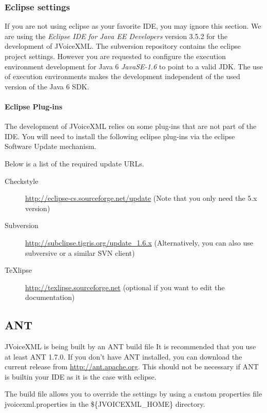 \documentclass[11pt,a4paper]{article}
\begin{document}
\subsubsection{Eclipse settings}
\label{sec:eclipse}

If you are not using eclipse as your favorite IDE, you may ignore this section.
We are using the \emph{Eclipse IDE for Java EE Developers} version 3.5.2 for
the development of JVoiceXML. The subversion repository contains the eclipse
project settings. However you are requested to configure the execution
environment development for Java 6 \emph{JavaSE-1.6} to point to a valid JDK.
The use of execution environments makes the development independent of the
used version of the Java 6 SDK.

\paragraph{Eclipse Plug-ins}

The development of JVoiceXML relies on some plug-ins that are not part of the
IDE. You will need to install the following eclipse plug-ins via the eclipse
Software Update mechanism.

Below is a list of the required update URLs.

\begin{description}
\item[Checkstyle] \url{http://eclipse-cs.sourceforge.net/update} (Note that you
only need the 5.x version)
\item[Subversion] \url{http://subclipse.tigris.org/update_1.6.x}
(Alternatively, you can also use subversive or a similar SVN client)
\item[TeXlipse] \url{http://texlipse.sourceforge.net} (optional if you want to
edit the documentation)
\end{description}

\subsection{ANT}
\label{sec:ant}

JVoiceXML is being built by an ANT build file It is recommended that
you use at least ANT 1.7.0. 
If you don't have ANT installed, you can download the current release
from \url{http://ant.apache.org}. This should not be necessary if ANT is builtin
your IDE as it is the case with eclipse.

The build file allows you to override the settings by using a custom 
properties file jvoicexml.properties in the \$\{JVOICEXML\_HOME\}
directory.
\end{document}
